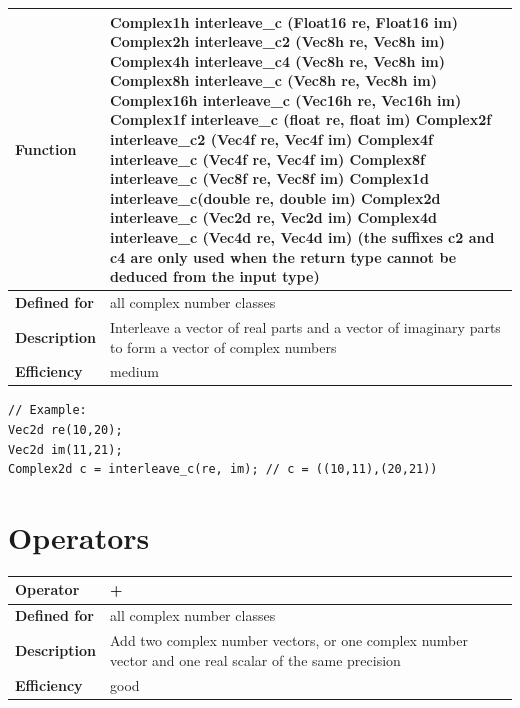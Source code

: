 \documentclass[11pt,a4paper,oneside,openright]{report}
\newcommand{\vspacesmall}{\vspace{3mm}}
\newcommand{\vspacebig}{\vspace{6mm}}
\begin{document}
\begin{tabular}{|p{25mm}|p{100mm}|}
\hline
\bfseries Function & 
Complex1h interleave\_c (Float16 re, Float16 im) \newline
Complex2h interleave\_c2 (Vec8h re, Vec8h im) \newline
Complex4h interleave\_c4 (Vec8h re, Vec8h im) \newline
Complex8h interleave\_c (Vec8h re, Vec8h im) \newline
Complex16h interleave\_c (Vec16h re, Vec16h im) \newline
Complex1f interleave\_c (float re, float im) \newline
Complex2f interleave\_c2 (Vec4f re, Vec4f im) \newline
Complex4f interleave\_c (Vec4f re, Vec4f im) \newline
Complex8f interleave\_c (Vec8f re, Vec8f im) \newline
Complex1d interleave\_c(double re, double im) \newline
Complex2d interleave\_c (Vec2d re, Vec2d im) \newline
Complex4d interleave\_c (Vec4d re, Vec4d im) \newline
(the suffixes c2 and c4 are only used when the return type cannot be deduced from the input type) \\ \hline
\bfseries Defined for & all complex number classes \\ \hline
\bfseries Description & Interleave a vector of real parts and a vector of imaginary parts to form a vector of complex numbers \\ \hline
\bfseries Efficiency & medium  \\ \hline
\end{tabular}
\vspacesmall

\begin{lstlisting}[frame=none]
// Example:
Vec2d re(10,20);
Vec2d im(11,21);
Complex2d c = interleave_c(re, im); // c = ((10,11),(20,21))
\end{lstlisting}
\vspacebig


\chapter{Operators}\label{chap:Operators}

\begin{tabular}{|p{25mm}|p{100mm}|}
\hline
\bfseries Operator & + \\ \hline
\bfseries Defined for & all complex number classes  \\ \hline
\bfseries Description & Add two complex number vectors, or one complex number vector and one real scalar of the same precision \\ \hline
\bfseries Efficiency & good \\ \hline
\end{tabular}
\vspacesmall
\end{document}

